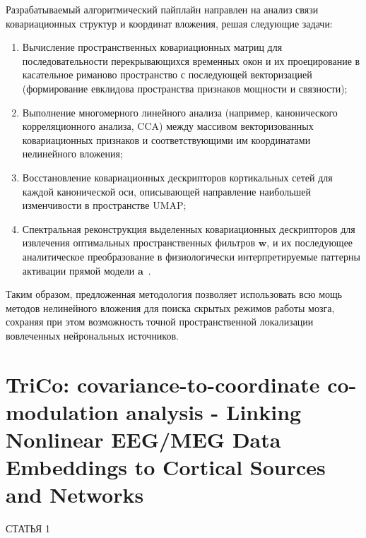 Разрабатываемый алгоритмический пайплайн направлен на анализ связи ковариационных структур и координат вложения, решая следующие задачи:
\begin{enumerate}
	\item Вычисление пространственных ковариационных матриц для последовательности перекрывающихся временных окон и их проецирование в касательное риманово пространство с последующей векторизацией (формирование евклидова пространства признаков мощности и связности);
	\item Выполнение многомерного линейного анализа (например, канонического корреляционного анализа, CCA) между массивом векторизованных ковариационных признаков и соответствующими им координатами нелинейного вложения;
	\item Восстановление ковариационных дескрипторов кортикальных сетей для каждой канонической оси, описывающей направление наибольшей изменчивости в пространстве UMAP;
	\item Спектральная реконструкция выделенных ковариационных дескрипторов для извлечения оптимальных пространственных фильтров $\mathbf{w}$, и их последующее аналитическое преобразование в физиологически интерпретируемые паттерны активации прямой модели $\mathbf{a}$~\cite{parra2005recipes, haufe2014interpretation}.
\end{enumerate}

Таким образом, предложенная методология позволяет использовать всю мощь методов нелинейного вложения для поиска скрытых режимов работы мозга, сохраняя при этом возможность точной пространственной локализации вовлеченных нейрональных источников.

\section{TriCo: covariance-to-coordinate co-modulation analysis - Linking Nonlinear EEG/MEG Data Embeddings to Cortical Sources and Networks}
\label{sec:trico}

СТАТЬЯ 1